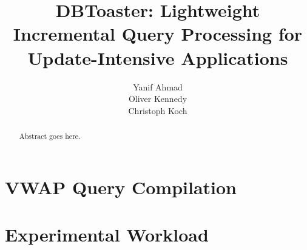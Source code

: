 \documentclass[preprint]{vldb}
\begin{document}
\title{DBToaster: Lightweight Incremental Query Processing for Update-Intensive
Applications}
\author{
\alignauthor
Yanif Ahmad\\
\alignauthor
Oliver Kennedy\\
\alignauthor
Christoph Koch\\
}
\maketitle

\begin{abstract}
Abstract goes here.
\end{abstract}











\appendix

\section{VWAP Query Compilation}

\section{Experimental Workload}
\end{document}
